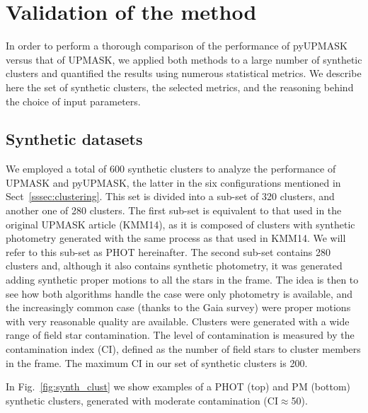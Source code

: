\documentclass[draft]{aa}
\begin{document}
\section{Validation of the method}
 \label{sec:validation}

 In order to perform a thorough comparison of the performance of pyUPMASK
 versus that of UPMASK, we applied both methods to a large number of synthetic
 clusters and quantified the results using numerous statistical metrics.
 We describe here the set of synthetic clusters, the selected metrics, and the
 reasoning behind the choice of input parameters.



\subsection{Synthetic datasets}
 \label{ssec:synthetic}

 We employed a total of 600 synthetic clusters to analyze the performance of
 UPMASK and pyUPMASK, the latter in the six configurations mentioned in
 Sect~\ref{sssec:clustering}. This set is divided into a sub-set of 320
 clusters, and another one of 280 clusters. The first sub-set is equivalent to
 that used in the original UPMASK article (KMM14), as it is composed of
 clusters with synthetic photometry generated with the same process as that
 used in KMM14. We will refer to this sub-set as PHOT hereinafter.
 The second sub-set contains 280 clusters and, although it also contains
 synthetic photometry, it was generated adding synthetic proper motions to all
 the stars in the frame.
 The idea is then to see how both algorithms handle the case were only
 photometry is available, and the increasingly common case (thanks to the Gaia
 survey) were proper motions with very reasonable quality are available.
 Clusters were generated with a wide range of field star contamination.
 The level of contamination is measured by the contamination index (CI),
 defined as the number of field stars to cluster members in the frame. The
 maximum CI in our set of synthetic clusters is 200.

 In Fig.~\ref{fig:synth_clust} we show examples of a PHOT (top) and PM
 (bottom) synthetic clusters, generated with moderate contamination 
 (CI$\approx$50).
\end{document}
